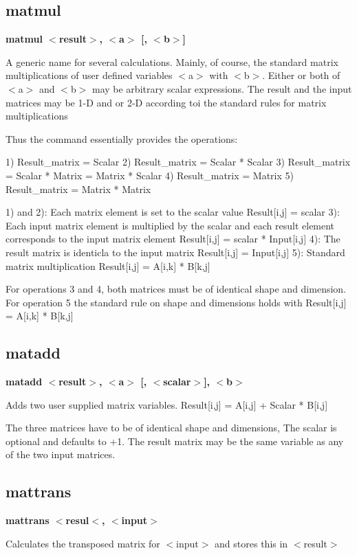 \subsection*{matmul}
{\bf matmul $ <$result$> $, $ <$a$> $ [, $ <$b$> $] \par }
\par
\vspace{3pt}
A generic name for several calculations. Mainly, of course, the 
standard matrix multiplications of user defined variables 
$ <$a$> $ with $ <$b$> $. 
Either or both of $ <$a$> $ and $ <$b$> $ may be arbitrary scalar expressions. 
The result and the input matrices may be 1-D and or 2-D 
according toi the standard rules for matrix multiplications 
\par
Thus the command essentially provides the operations: 
\par
1) Result\_matrix = Scalar 
2) Result\_matrix = Scalar * Scalar 
3) Result\_matrix = Scalar * Matrix = Matrix * Scalar 
4) Result\_matrix = Matrix 
5) Result\_matrix = Matrix * Matrix 
\par
1) and 2): Each matrix element is set to the scalar value 
    Result[i,j] = scalar 
3): Each input matrix element is multiplied by the scalar 
    and each result element corresponds to the input matrix 
    element 
    Result[i,j] = scalar * Input[i,j] 
4): The result matrix is identicla to the input matrix 
    Result[i,j] = Input[i,j] 
5): Standard matrix multiplication 
    Result[i,j] = A[i,k] * B[k,j] 
\par
For operations 3 and 4, both matrices must be of identical 
shape and dimension. 
For operation 5 the standard rule on shape and dimensions 
holds with 
    Result[i,j] = A[i,k] * B[k,j] 
\subsection*{matadd}
{\bf matadd $ <$result$> $, $ <$a$> $ [, $ <$scalar$> $], $ <$b$> $ \par }
\par
\vspace{3pt}
Adds two user supplied matrix variables. 
    Result[i,j] = A[i,j] + Scalar * B[i,j] 
\par
The three matrices have to be of identical shape and dimensions, 
The scalar is optional and defaults to +1. 
The result matrix may be the same variable as any of the 
two input matrices. 
\subsection*{mattrans}
{\bf mattrans $ <$resul$ <$, $ <$input$> $ \par }
\par
\vspace{3pt}
Calculates the transposed matrix for $ <$input$> $ and stores this 
in $ <$result$> $ 
\par
